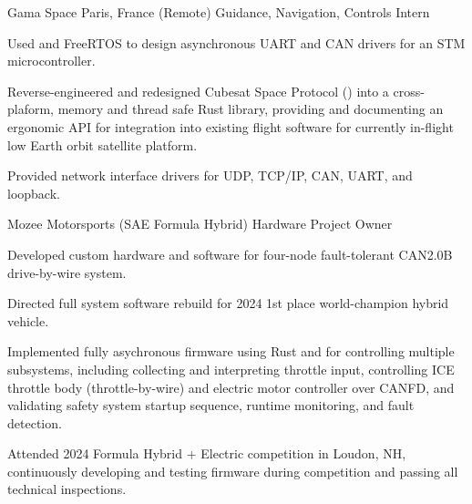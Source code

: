 \documentclass[11pt]{article}
\begin{document}
\sectionloc
{Gama Space} {Paris, France (Remote)}
{Guidance, Navigation, Controls Intern} {}
{\begin{circlist}
	\item Used  and FreeRTOS to design asynchronous UART and CAN drivers for an STM microcontroller.
	\item Reverse-engineered and redesigned Cubesat Space Protocol () into a cross-plaform, memory and thread safe Rust library, 
	      providing and documenting an ergonomic API for integration into existing flight software for currently in-flight low Earth orbit satellite platform.
	\item Provided network interface drivers for UDP, TCP/IP, CAN, UART, and loopback. 
\end{circlist}}



\sectiondate
{Mozee Motorsports (SAE Formula Hybrid)}
{Hardware Project Owner} {}  

{\vspace{-1.4ex}}
\begin{circlist}
	\item Developed custom hardware and software for four-node fault-tolerant CAN2.0B drive-by-wire system.
\end{circlist}
{\vspace{-1.4ex}}
\begin{circlist}
	\item Directed full system software rebuild for 2024 1st place world-champion hybrid vehicle.
	\item Implemented fully asychronous firmware using Rust and  for controlling multiple subsystems, including collecting and interpreting throttle input, controlling ICE throttle body (throttle-by-wire) and electric motor controller over CANFD, and validating safety system startup sequence, runtime monitoring, and fault detection.
	\item Attended 2024 Formula Hybrid + Electric competition in Loudon, NH, continuously developing and testing firmware during competition and passing all technical inspections.
\end{circlist}
\end{document}
